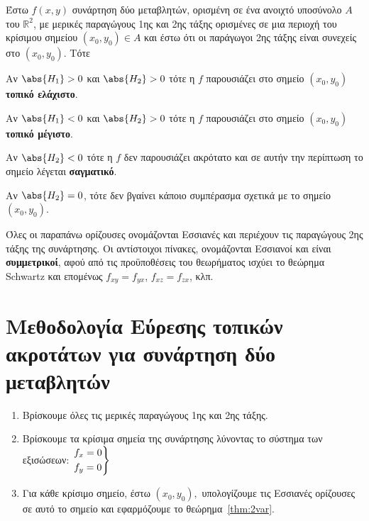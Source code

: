 \documentclass[a4paper,table]{report} 
\begin{document}
\begin{mybox2}
\begin{thm}
  \label{thm:2var}
\item {}
  Έστω $ f(x,y) $ συνάρτηση δύο μεταβλητών, ορισμένη σε ένα ανοιχτό 
  υποσύνολο $A$ του $ \mathbb{R}^{2} $, με μερικές παραγώγους 1ης και 2ης τάξης 
  ορισμένες σε μια  περιοχή του κρίσιμου σημείου $ (x_{0}, y_{0}) \in A $ και 
  έστω ότι οι παράγωγοι 2ης τάξης είναι συνεχείς στο $ (x_{0}, y_{0}) $. Τότε
\end{thm}

\begin{myitemize}
  \item Αν $ \abs{H_{1}} > 0 $ και $ \abs{H_{2}} > 0 $ τότε η $f$ παρουσιάζει στο 
    σημείο $ (x_{0}, y_{0}) $ \textbf{τοπικό ελάχιστο}.
  \item Αν $ \abs{H_{1}} < 0 $ και $ \abs{H_{2}} > 0 $ τότε η $f$ παρουσιάζει στο 
    σημείο $ (x_{0}, y_{0}) $ \textbf{τοπικό μέγιστο}.
  \item Αν $ \abs{H_{2}} < 0 $ τότε η $f$ δεν παρουσιάζει ακρότατο και σε αυτήν 
    την περίπτωση το σημείο λέγεται \textbf{σαγματικό}.
  \item Αν $ \abs{H_{2}} = 0 $, τότε δεν βγαίνει κάποιο συμπέρασμα σχετικά με το 
    σημείο $ (x_{0}, y_{0}) $.
\end{myitemize}
\end{mybox2}


\begin{rem}
  Όλες οι παραπάνω ορίζουσες ονομάζονται \textcolor{Col1}{Εσσιανές} και περιέχουν τις 
  παραγώγους 2ης τάξης της συνάρτησης. Οι αντίστοιχοι πίνακες, ονομάζονται 
  \textcolor{Col1}{Εσσιανοί} 
  και είναι \textbf{συμμετρικοί}, αφού από τις προϋποθέσεις του θεωρήματος ισχύει το 
  θεώρημα Schwartz και επομένως $ f_{xy} = f_{yx} $, $ f_{xz} = f_{zx} $, κλπ.
\end{rem}



\section{Μεθοδολογία Εύρεσης τοπικών ακροτάτων για συνάρτηση δύο μεταβλητών}

\begin{enumerate}
  \item Βρίσκουμε όλες τις μερικές παραγώγους 1ης και 2ης τάξης.
  \item Βρίσκουμε τα κρίσιμα σημεία της συνάρτησης λύνοντας το σύστημα των εξισώσεων: 
    $ \begin{rcases}
      f_{x} = 0 \\
      f_{y} = 0  
    \end{rcases} $
  \item Για κάθε κρίσιμο σημείο, έστω $ (x_{0}, y_{0}), $ υπολογίζουμε τις Εσσιανές 
    ορίζουσες σε αυτό το σημείο και εφαρμόζουμε το θεώρημα~\ref{thm:2var}.
\end{enumerate}
\end{document}
